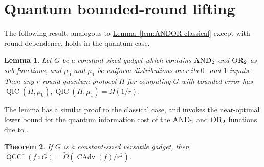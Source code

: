 \documentclass[10pt,a4paper]{article}
\newtheorem{theorem}{Theorem}
\newtheorem{lemma}[theorem]{Lemma}
\theoremstyle{definition}
\newcommand{\lem}[1]{\hyperref[lem:#1]{Lemma~\ref*{lem:#1}}}
\newcommand{\tOmega}{\tilde{\Omega}}
\renewcommand{\>}{\rangle}
\newcommand{\<}{\langle}
\newcommand{\OR}{\textsc{OR}}
\newcommand{\AND}{\textsc{AND}}
\DeclareMathOperator{\CAdv}{CAdv}
\DeclareMathOperator{\QCC}{QCC}
\DeclareMathOperator{\QIC}{QIC}
\begin{document}
\section{Quantum bounded-round lifting}

The following result, analogous to \lem{ANDOR-classical} except with round dependence, holds in the quantum case.

\begin{lemma}\label{lem:ANDOR-quantum}
Let $G$ be a constant-sized gadget which contains
$\AND_2$ and $\OR_2$ as sub-functions, and $\mu_0$ and $\mu_1$ be uniform distributions over its $0$- and $1$-inputs.
Then any $r$-round quantum protocol $\Pi$ for computing $G$
with bounded error has
$\QIC(\Pi,\mu_0), \QIC(\Pi,\mu_1) = \tOmega(1/r)$.
\end{lemma}

The lemma has a similar proof to the classical case, and invokes the near-optimal lower bound for the quantum information
cost of the $\AND_2$ and $\OR_2$ functions due to \cite{BGK+18}.

\begin{theorem}
If $G$ is a constant-sized versatile gadget,
then $\QCC^r(f\circ G) = \tOmega(\CAdv(f)/r^2)$.
\end{theorem}
\end{document}
